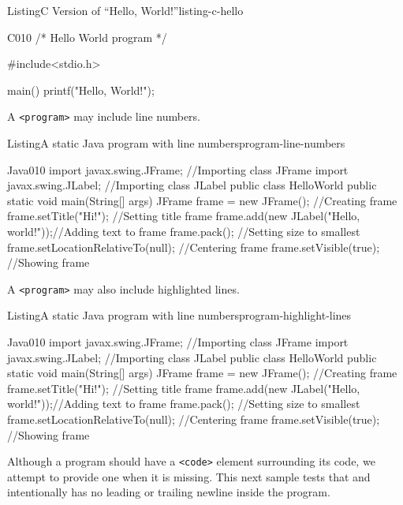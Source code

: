 \documentclass{sn-jnl}
\theoremstyle{thmstyleone}%
\theoremstyle{thmstyletwo}%
\theoremstyle{thmstylethree}%
\newcommand{\mono}[1]{\texttt{#1}}
\numberwithin{equation}{section}
\begin{document}
\begin{listingptx}{Listing}{C Version of ``Hello, World!''}{listing-c-hello}{}%
\begin{program}{C}{0}{1}{0}
/* Hello World program */

#include<stdio.h>

main()
{
    printf("Hello, World!");
}
\end{program}
\tcblower
\end{listingptx}%
A \mono{<program>} may include line numbers.%
\begin{listingptx}{Listing}{A static Java program with line numbers}{program-line-numbers}{}%
\begin{programnumbered}{Java}{0}{1}{0}
import javax.swing.JFrame;  //Importing class JFrame
import javax.swing.JLabel;  //Importing class JLabel
public class HelloWorld {
    public static void main(String[] args) {
        JFrame frame = new JFrame();           //Creating frame
        frame.setTitle("Hi!");                 //Setting title frame
        frame.add(new JLabel("Hello, world!"));//Adding text to frame
        frame.pack();                          //Setting size to smallest
        frame.setLocationRelativeTo(null);     //Centering frame
        frame.setVisible(true);                //Showing frame
    }
}
\end{programnumbered}
\tcblower
\end{listingptx}%
A \mono{<program>} may also include highlighted lines.%
\begin{listingptx}{Listing}{A static Java program with line numbers}{program-highlight-lines}{}%
\begin{programnumbered}{Java}{0}{1}{0}
import javax.swing.JFrame;  //Importing class JFrame
import javax.swing.JLabel;  //Importing class JLabel
public class HelloWorld {
    public static void main(String[] args) {
        JFrame frame = new JFrame();           //Creating frame
        frame.setTitle("Hi!");                 //Setting title frame
        frame.add(new JLabel("Hello, world!"));//Adding text to frame
        frame.pack();                          //Setting size to smallest
        frame.setLocationRelativeTo(null);     //Centering frame
        frame.setVisible(true);                //Showing frame
    }
}
\end{programnumbered}
\tcblower
\end{listingptx}%
Although a program should have a \mono{<code>} element surrounding its code, we attempt to provide one when it is missing. This next sample tests that and intentionally has no leading or trailing newline inside the program.%
\end{document}
